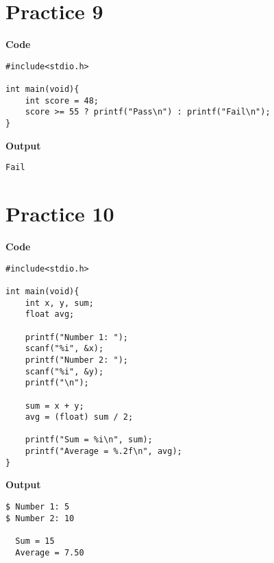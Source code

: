 \documentclass[a4paper, 11pt]{article}
\begin{document}
    \section*{Practice 9}
    \begin{minipage}[t]{0.5\textwidth}
        \large \textbf{Code}
        \begin{lstlisting}[style=code]
#include<stdio.h>

int main(void){
    int score = 48;
    score >= 55 ? printf("Pass\n") : printf("Fail\n");
}
        \end{lstlisting}
    \end{minipage}
    \hspace{0.5cm}
    \begin{minipage}[t]{0.5\textwidth}
        \large \textbf{Output}
        \begin{lstlisting}[style=output]
Fail
        \end{lstlisting}
    \end{minipage}

    \section*{Practice 10}
    \begin{minipage}[t]{0.5\textwidth}
        \large \textbf{Code}
        \begin{lstlisting}[style=code]
#include<stdio.h>

int main(void){
    int x, y, sum;
    float avg;

    printf("Number 1: ");
    scanf("%i", &x);
    printf("Number 2: ");
    scanf("%i", &y);
    printf("\n");

    sum = x + y;
    avg = (float) sum / 2;

    printf("Sum = %i\n", sum);
    printf("Average = %.2f\n", avg);
}
        \end{lstlisting}
    \end{minipage}
    \hspace{0.5cm}
    \begin{minipage}[t]{0.5\textwidth}
        \large \textbf{Output}
        \begin{lstlisting}[style=output]
$ Number 1: 5
$ Number 2: 10

  Sum = 15
  Average = 7.50
        \end{lstlisting}
    \end{minipage}
\end{document}
